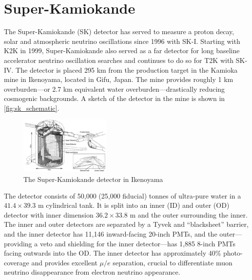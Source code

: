\section{Super-Kamiokande}
\label{sec:sk}
The Super-Kamiokande (SK)\cite{t2k_sk, t2k_sk2, t2k_sk3} detector has served to measure a proton decay, solar and atmospheric neutrino oscillations since 1996 with SK-I. Starting with K2K\cite{k2k_design} in 1999, Super-Kamiokande also served as a far detector for long baseline accelerator neutrino oscillation searches and continues to do so for T2K with SK-IV. The detector is placed 295 km from the production target in the Kamioka mine in Ikenoyama, located in Gifu, Japan. The mine provides roughly 1 km overburden---or 2.7 km equivalent water overburden---drastically reducing cosmogenic backgrounds. A sketch of the detector in the mine is shown in \autoref{fig:sk_schematic}.
\begin{figure}[h]
	\includegraphics[width=0.4\textwidth, trim={0mm 0mm 0mm 0mm}, clip,page=1]{figures/det_chap/sk/sk.pdf}
	\caption{The Super-Kamiokande detector in Ikenoyama}
	\label{fig:sk_schematic}
\end{figure}

The detector consists of 50,000 (25,000 fiducial) tonnes of ultra-pure water in a $41.4\times39.3\text{ m}$ cylindrical tank. It is split into an inner (ID) and outer (OD) detector with inner dimension $36.2\times33.8\text{ m}$ and the outer surrounding the inner. The inner and outer detectors are separated by a Tyvek and ``blacksheet'' barrier, and the inner detector has 11,146 inward-facing 20-inch PMTs, and the outer---providing a veto and shielding for the inner detector---has 1,885 8-inch PMTs facing outwards into the OD. The inner detector has approximately 40\% photo-coverage and provides excellent $\mu/e$ separation, crucial to differentiate muon neutrino disappearance from electron neutrino appearance.

